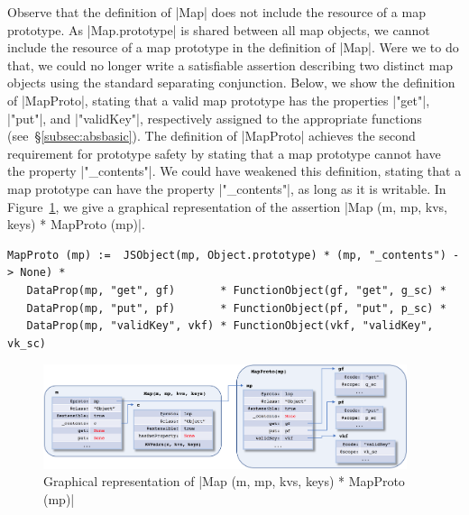 Observe that the definition of \jsinline|Map| does not include the resource of a map prototype. 
As \jsinline|Map.prototype| is shared between all map objects, we cannot include the resource of a map prototype 
in the definition of \jsinline|Map|. Were we to do that, we could no longer write a satisfiable assertion 
describing two distinct map objects using the standard separating conjunction.
Below, we show the definition of \jsinline|MapProto|, stating that a valid map prototype has the properties 
\jsinline|"get"|, \jsinline|"put"|, and \jsinline|"validKey"|, respectively assigned to the appropriate functions (see~\S\ref{subsec:absbasic}). 
The definition of \jsinline|MapProto| achieves the second requirement for prototype safety by stating that a 
map prototype cannot have the property \jsinline|"_contents"|. We could have weakened this definition, stating that 
a map prototype can have the property \jsinline|"_contents"|, as long as it is writable. 
In Figure~\ref{fig:objmap}, we give a graphical representation of the assertion
\jsinline|Map (m, mp, kvs, keys) * MapProto (mp)|.
\vspace{3pt}
\begin{center}
{\footnotesize
 \begin{verbatim}
MapProto (mp) :=  JSObject(mp, Object.prototype) * (mp, "_contents") -> None) * 
   DataProp(mp, "get", gf)       * FunctionObject(gf, "get", g_sc) * 
   DataProp(mp, "put", pf)       * FunctionObject(pf, "put", p_sc) * 
   DataProp(mp, "validKey", vkf) * FunctionObject(vkf, "validKey", vk_sc) 
\end{verbatim}}
\end{center}

\begin{figure}[t]
\includegraphics[width=0.95\textwidth]{figures/objectAsMap.png}
\vspace*{-0.2cm}
\caption{Graphical representation of
\jsinline|Map (m, mp, kvs, keys) * MapProto (mp)|}
\label{fig:objmap}
\vspace*{-0.3cm}
\end{figure}



